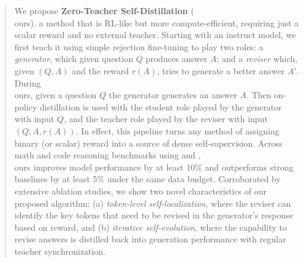 \begin{abstract}
We propose \textbf{Zero-Teacher Self-Distillation} (\\ours{}{}), a method that is RL-like but more compute-efficient, requiring just a scalar reward and no external teacher. Starting with an instruct model, we first teach it using simple rejection fine-tuning  to play two roles: a \emph{generator}, which given question $Q$ produces answer $A$; and a \emph{reviser} which, given $(Q, A)$ and the reward $r(A)$, tries to generate a better answer $A'$.
During \\ours{}{}, given a question $Q$ the generator generates an answer $A$. Then on-policy distillation  is used with the student role played by  the generator with input $Q$, and the teacher role played by the reviser with input $(Q, A, r(A))$. 
In effect, this pipeline turns any method of assigning binary (or scalar) reward into a source of dense self-supervision. 
Across math and code reasoning benchmarks using \qwen{} and \olmo{}, \\ours{}{} improves model performance by at least 10\% 
and outperforms strong baselines by at least 5\% under the same data budget. 
Corroborated by extensive ablation studies, we show two novel characteristics of our proposed algorithm: (a) \emph{token-level self-localization}, where the reviser can identify the key tokens that need to be revised in the generator's response based on reward,  and (b) \emph{iterative self-evolution}, where the capability to revise answers is distilled back into generation performance with regular teacher synchronization. 
\fi




\end{abstract}
